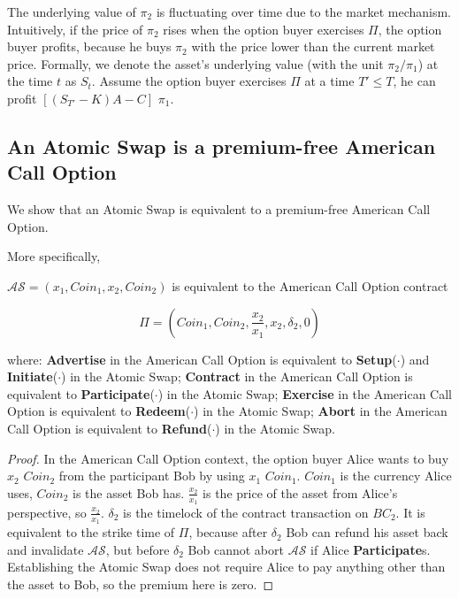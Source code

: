 The underlying value of $\pi_2$ is fluctuating over time due to the market mechanism.
Intuitively, if the price of $\pi_2$ rises when the option buyer exercises $\Pi$, the option buyer profits, because he buys $\pi_2$ with the price lower than the current market price.
Formally, we denote the asset's underlying value (with the unit $\pi_2 / \pi_1$) at the time $t$ as $S_t$.
Assume the option buyer exercises $\Pi$ at a time $T' \leq T$, he can profit $[(S_{T'} - K) A - C]$ $\pi_1$.













\subsection{An Atomic Swap is a premium-free American Call Option}

We show that an Atomic Swap is equivalent to a premium-free American Call Option.

More specifically,

\begin{theorem}
$\mathcal{AS} = (x_1, Coin_1, x_2, Coin_2)$ is equivalent to the American Call Option contract

$$
\Pi = (Coin_1, Coin_2, \frac{x_2}{x_1}, x_2, \delta_2, 0)
$$

where:
\textbf{Advertise} in the American Call Option is equivalent to \textbf{Setup}($\cdot$) and \textbf{Initiate}($\cdot$) in the Atomic Swap;
\textbf{Contract} in the American Call Option is equivalent to \textbf{Participate}($\cdot$) in the Atomic Swap;
\textbf{Exercise} in the American Call Option is equivalent to \textbf{Redeem}($\cdot$) in the Atomic Swap;
\textbf{Abort} in the American Call Option is equivalent to \textbf{Refund}($\cdot$) in the Atomic Swap.

\end{theorem}


\begin{proof}

In the American Call Option context, the option buyer Alice wants to buy $x_2$ $Coin_2$ from the participant Bob by using $x_1$ $Coin_1$.
$Coin_1$ is the currency Alice uses, $Coin_2$ is the asset Bob has.
$\frac{x_2}{x_1}$ is the price of the asset from Alice's perspective, so $\frac{x_2}{x_1}$.
$\delta_2$ is the timelock of the contract transaction on $BC_2$.
It is equivalent to the strike time of $\Pi$, because after $\delta_2$ Bob can refund his asset back and invalidate $\mathcal{AS}$, but before $\delta_2$ Bob cannot abort $\mathcal{AS}$ if Alice \textbf{Participate}s.
Establishing the Atomic Swap does not require Alice to pay anything other than the asset to Bob, so the premium here is zero.
\end{proof}